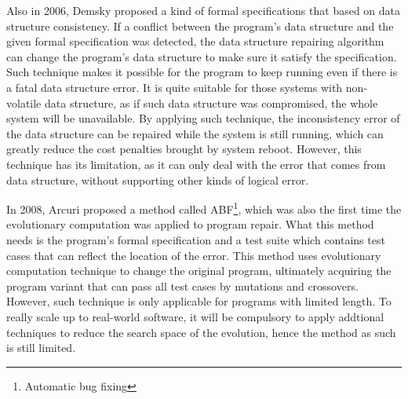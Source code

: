 Also in 2006, Demsky proposed a kind of formal specifications that based on data structure consistency\cite{IaEoDSCS}.
If a conflict between the program's data structure and the given formal specification was detected, the data structure repairing algorithm can change the program's data structure to make sure it satisfy the specification.
Such technique makes it possible for the program to keep running even if there is a fatal data structure error.
It is quite suitable for those systems with non-volatile data structure, as if such data structure was compromised, the whole system will be unavailable.
By applying such technique, the inconsistency error of the data structure can be repaired while the system is still running, which can greatly reduce the cost penalties brought by system reboot.
However, this technique has its limitation, as it can only deal with the error that comes from data structure, without supporting other kinds of logical error.

In 2008, Arcuri proposed a method called ABF\footnote{Automatic bug fixing}, which was also the first time the evolutionary computation was applied to program repair\cite{ANCEAtASBF}.
What this method needs is the program's formal specification and a test suite which contains test cases that can reflect the location of the error.
This method uses evolutionary computation technique to change the original program, ultimately acquiring the program variant that can pass all test cases by mutations and crossovers.
However, such technique is only applicable for programs with limited length. To really scale up to real-world software, it will be compulsory to apply addtional techniques to reduce the search space of the evolution, hence the method as such is still limited.

